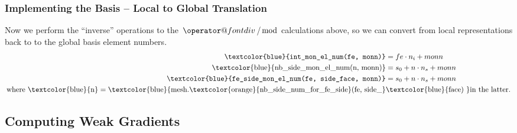 \documentclass[compress]{beamer}
\makeatletter
\newcommand*{\bdiv}{%
  \nonscript\mskip-\medmuskip\mkern5mu%
  \mathbin{\operator@font div}\penalty900\mkern5mu%
  \nonscript\mskip-\medmuskip
}
\makeatother
\begin{document}
\begin{frame}
  \frametitle{Implementing the Basis -- Local to Global Translation}
  \pause
  Now we perform the ``inverse'' operations to the $\bdiv$/$\bmod$ calculations above, so we can convert from local representations back to
  to the global basis element numbers.
  \pause
  \begin{align*}
    \text{\texttt{\textcolor{blue}{int\_mon\_el\_num({fe, monn})}}} &= fe \cdot n_i + monn \\
    \text{\textcolor{blue}{nb\_side\_mon\_el\_num({n, monn})}} &= s_0 + n \cdot n_s + monn\\
    \text{\texttt{\textcolor{blue}{fe\_side\_mon\_el\_num({fe, side\_face, monn})}}} &= s_0 + n \cdot n_s + monn\\
      \text{where } \text{\textcolor{blue}{n}} = 
      \text{\textcolor{blue}{mesh.\textcolor{orange}{nb\_side\_num\_for\_fe\_side}(fe, side\_}}&\text{\textcolor{blue}{face) }}
        \text{in the latter}.
  \end{align*}
\end{frame}

\subsection{Computing Weak Gradients}
\end{document}
